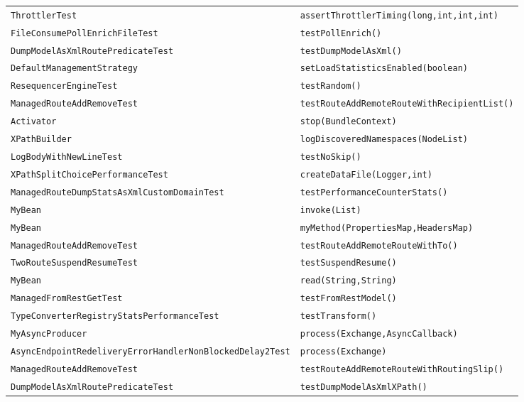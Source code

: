 \begin{center}
\begin{longtable}{ll}
\lstinline/ThrottlerTest/&{\lstinline/assertThrottlerTiming(long,int,int,int)/}\\
\lstinline/FileConsumePollEnrichFileTest/&{\lstinline/testPollEnrich()/}\\
\lstinline/DumpModelAsXmlRoutePredicateTest/&{\lstinline/testDumpModelAsXml()/}\\
\lstinline/DefaultManagementStrategy/&{\lstinline/setLoadStatisticsEnabled(boolean)/}\\
\lstinline/ResequencerEngineTest/&{\lstinline/testRandom()/}\\
\lstinline/ManagedRouteAddRemoveTest/&{\lstinline/testRouteAddRemoteRouteWithRecipientList()/}\\
\lstinline/Activator/&{\lstinline/stop(BundleContext)/}\\
\lstinline/XPathBuilder/&{\lstinline/logDiscoveredNamespaces(NodeList)/}\\
\lstinline/LogBodyWithNewLineTest/&{\lstinline/testNoSkip()/}\\
\lstinline/XPathSplitChoicePerformanceTest/&{\lstinline/createDataFile(Logger,int)/}\\
\lstinline/ManagedRouteDumpStatsAsXmlCustomDomainTest/&{\lstinline/testPerformanceCounterStats()/}\\
\lstinline/MyBean/&{\lstinline/invoke(List)/}\\
\lstinline/MyBean/&{\lstinline/myMethod(PropertiesMap,HeadersMap)/}\\
\lstinline/ManagedRouteAddRemoveTest/&{\lstinline/testRouteAddRemoteRouteWithTo()/}\\
\lstinline/TwoRouteSuspendResumeTest/&{\lstinline/testSuspendResume()/}\\
\lstinline/MyBean/&{\lstinline/read(String,String)/}\\
\lstinline/ManagedFromRestGetTest/&{\lstinline/testFromRestModel()/}\\
\lstinline/TypeConverterRegistryStatsPerformanceTest/&{\lstinline/testTransform()/}\\
\lstinline/MyAsyncProducer/&{\lstinline/process(Exchange,AsyncCallback)/}\\
\lstinline/AsyncEndpointRedeliveryErrorHandlerNonBlockedDelay2Test/&{\lstinline/process(Exchange)/}\\
\lstinline/ManagedRouteAddRemoveTest/&{\lstinline/testRouteAddRemoteRouteWithRoutingSlip()/}\\
\lstinline/DumpModelAsXmlRoutePredicateTest/&{\lstinline/testDumpModelAsXmlXPath()/}\\

\end{longtable}
\end{center}

